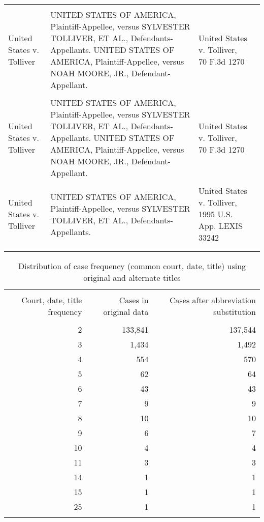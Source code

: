 \documentclass[10pt, letterpaper]{article}
\begin{document}
\begin{spacing}{1.0}
\begin{footnotesize}
\begin{longtable}[H]{>{\raggedright}p{2in}>{\raggedright}p{2in}>{\raggedright}p{2in}p{0in}}
        & & &\\[-4pt]
        \hline\\[-4pt]
        United States v. Tolliver & UNITED STATES OF AMERICA, Plaintiff-Appellee, versus SYLVESTER TOLLIVER, ET AL., Defendants-Appellants. UNITED STATES OF AMERICA, Plaintiff-Appellee, versus NOAH MOORE, JR., Defendant-Appellant. & United States v. Tolliver, 70 F.3d 1270 &\\
        & & &\\[-4pt]
        United States v. Tolliver & UNITED STATES OF AMERICA, Plaintiff-Appellee, versus SYLVESTER TOLLIVER, ET AL., Defendants-Appellants. UNITED STATES OF AMERICA, Plaintiff-Appellee, versus NOAH MOORE, JR., Defendant-Appellant. & United States v. Tolliver, 70 F.3d 1270 &\\
        & & &\\[-4pt]
        United States v. Tolliver & UNITED STATES OF AMERICA, Plaintiff-Appellee, versus SYLVESTER TOLLIVER, ET AL., Defendants-Appellants. & United States v. Tolliver, 1995 U.S. App. LEXIS 33242 &\\
        \hline\\[-6pt]
    \label{tab:exampleCaseTitlesDup}
\end{longtable}
\end{footnotesize}

\clearpage

\begin{table}[H]
    \centering
    \caption{Distribution of case frequency (common court, date, title) using original and alternate titles}
    \begin{tabular}{rrr}
    \hline\\[-6pt]
    Court, date, title frequency & Cases in original data & Cases after abbreviation substitution\\[4pt]
    \hline\\[-6pt]
    2 & 133,841 & 137,544\\
    3 &   1,434 &   1,492\\
    4 &     554 &     570\\
    5 &      62 &      64\\
    6 &      43 &      43\\
    7 &       9 &       9\\
    8 &      10 &      10\\
    9 &       6 &       7\\
    10 &       4 &       4\\
    11 &       3 &       3\\
    14 &       1 &       1\\
    15 &       1 &       1\\
    25 &       1 &       1\\[4pt]
    \hline\\[-6pt]
    \end{tabular}
    \label{tab:caseTitleDuplicateFreq}
\end{table}


\end{spacing}
\end{document}
